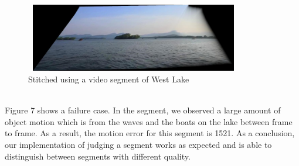\documentclass[12pt]{article}
\begin{document}
\begin{figure}[h]
	\centering
	\includegraphics[width=9.5cm, height=3cm]{lakeError1206-1310}
	\caption{Stitched using a video segment of West Lake}
\end{figure}\\
Figure 7 shows a failure case. In the segment, we observed a large amount of object motion which is from the waves and the boats on the lake between frame to frame. As a result, the motion error for this segment is 1521. As a conclusion, our implementation of judging a segment works as expected and is able to distinguish between segments with different quality.
\end{document}
